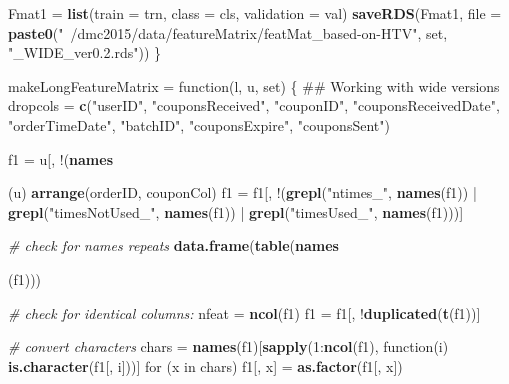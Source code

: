 \documentclass[10pt]{report}
\newenvironment{Shaded}{}{}
\newcommand{\KeywordTok}[1]{\textcolor[rgb]{0.00,0.44,0.13}{\textbf{{#1}}}}
\newcommand{\DataTypeTok}[1]{\textcolor[rgb]{0.56,0.13,0.00}{{#1}}}
\newcommand{\DecValTok}[1]{\textcolor[rgb]{0.25,0.63,0.44}{{#1}}}
\newcommand{\StringTok}[1]{\textcolor[rgb]{0.25,0.44,0.63}{{#1}}}
\newcommand{\CommentTok}[1]{\textcolor[rgb]{0.38,0.63,0.69}{\textit{{#1}}}}
\newcommand{\NormalTok}[1]{{#1}}
\begin{document}
\begin{Shaded}
\begin{Highlighting}[]
{{{{{{{{{{{{{{{    \NormalTok{Fmat1 =}\StringTok{ }\KeywordTok{list}\NormalTok{(}\DataTypeTok{train =} \NormalTok{trn, }\DataTypeTok{class =} \NormalTok{cls, }\DataTypeTok{validation =} \NormalTok{val)}
    \KeywordTok{saveRDS}\NormalTok{(Fmat1, }\DataTypeTok{file =} \KeywordTok{paste0}\NormalTok{(}\StringTok{"~/dmc2015/data/featureMatrix/featMat_based-on-HTV"}\NormalTok{, }
        \NormalTok{set, }\StringTok{"_WIDE_ver0.2.rds"}\NormalTok{))}
\NormalTok{\}}

\NormalTok{makeLongFeatureMatrix =}\StringTok{ }\NormalTok{function(l, u, set) \{}
    \NormalTok{## Working with wide versions}
    \NormalTok{dropcols =}\StringTok{ }\KeywordTok{c}\NormalTok{(}\StringTok{"userID"}\NormalTok{, }\StringTok{"couponsReceived"}\NormalTok{, }\StringTok{"couponID"}\NormalTok{, }\StringTok{"couponsReceivedDate"}\NormalTok{, }
        \StringTok{"orderTimeDate"}\NormalTok{, }\StringTok{"batchID"}\NormalTok{, }\StringTok{"couponsExpire"}\NormalTok{, }\StringTok{"couponsSent"}\NormalTok{)}
    
    \NormalTok{f1 =}\StringTok{ }\NormalTok{u[, !(}\KeywordTok{names}\NormalTok{(u) %in%}\StringTok{ }\NormalTok{dropcols)] %>%}\StringTok{ }\KeywordTok{left_join}\NormalTok{(l, }\DataTypeTok{by =} \KeywordTok{c}\NormalTok{(}\StringTok{"orderID"}\NormalTok{, }\StringTok{"couponCol"}\NormalTok{)) %>%}\StringTok{ }
\StringTok{        }\KeywordTok{arrange}\NormalTok{(orderID, couponCol)}
    \NormalTok{f1 =}\StringTok{ }\NormalTok{f1[, !(}\KeywordTok{grepl}\NormalTok{(}\StringTok{"ntimes_"}\NormalTok{, }\KeywordTok{names}\NormalTok{(f1)) |}\StringTok{ }\KeywordTok{grepl}\NormalTok{(}\StringTok{"timesNotUsed_"}\NormalTok{, }\KeywordTok{names}\NormalTok{(f1)) |}\StringTok{ }
\StringTok{        }\KeywordTok{grepl}\NormalTok{(}\StringTok{"timesUsed_"}\NormalTok{, }\KeywordTok{names}\NormalTok{(f1)))]}
    
    \CommentTok{# check for names repeats}
    \KeywordTok{data.frame}\NormalTok{(}\KeywordTok{table}\NormalTok{(}\KeywordTok{names}\NormalTok{(f1))) %>%}\StringTok{ }\KeywordTok{arrange}\NormalTok{(-Freq) %>%}\StringTok{ }\NormalTok{head}
    
    \CommentTok{# check for identical columns:}
    \NormalTok{nfeat =}\StringTok{ }\KeywordTok{ncol}\NormalTok{(f1)}
    \NormalTok{f1 =}\StringTok{ }\NormalTok{f1[, !}\KeywordTok{duplicated}\NormalTok{(}\KeywordTok{t}\NormalTok{(f1))]}
    
    \CommentTok{# convert characters}
    \NormalTok{chars =}\StringTok{ }\KeywordTok{names}\NormalTok{(f1)[}\KeywordTok{sapply}\NormalTok{(}\DecValTok{1}\NormalTok{:}\KeywordTok{ncol}\NormalTok{(f1), function(i) }\KeywordTok{is.character}\NormalTok{(f1[, i]))]}
    \NormalTok{for (x in chars) f1[, x] =}\StringTok{ }\KeywordTok{as.factor}\NormalTok{(f1[, x])}
    
}}}}}}}}}}}}}}}}}
\end{Highlighting}
\end{Shaded}
\end{document}
